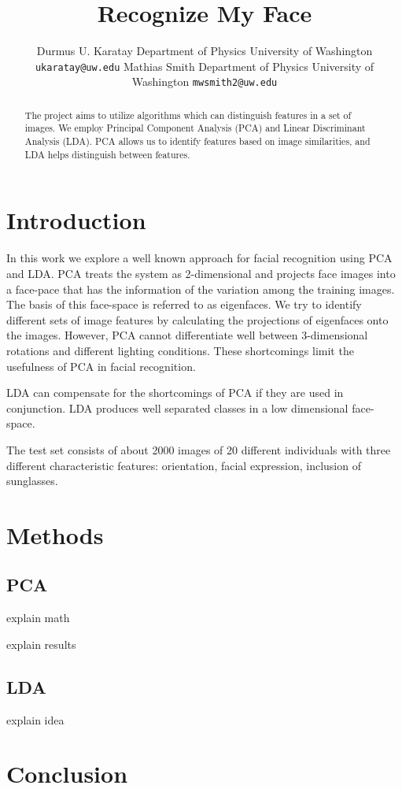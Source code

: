 \documentclass{article} %
\title{Recognize My Face}
\author{

Durmus U. Karatay
Department of Physics
University of Washington
\texttt{ukaratay@uw.edu}
\And
Mathias Smith
Department of Physics
University of Washington
\texttt{mwsmith2@uw.edu}

}
\begin{document}
\maketitle

\begin{abstract}
The project aims to utilize algorithms which can distinguish features in a set of images.  We employ Principal Component Analysis (PCA) and Linear Discriminant Analysis (LDA).  PCA allows us to identify features based on image similarities, and LDA helps distinguish between features.  
\end{abstract}

\section{Introduction}

In this work we explore a well known approach for facial recognition using PCA and LDA.  PCA treats the system as 2-dimensional and projects face images into a face-pace that has the information of the variation among the training images. The basis of this face-space is referred to as eigenfaces.  We try to identify different sets of image features by calculating the projections of eigenfaces onto the images.  However, PCA cannot differentiate well between 3-dimensional rotations and different lighting conditions.  These shortcomings limit the usefulness of PCA in facial recognition.

LDA can compensate for the shortcomings of PCA if they are used in conjunction.  LDA produces well separated classes in a low dimensional face-space.



The test set consists of about 2000 images of 20 different individuals with three different characteristic features: orientation, facial expression, inclusion of sunglasses.

\section{Methods}

\subsection{PCA}

explain math

explain results

\subsection{LDA}

explain idea

\section{Conclusion}
\end{document}
